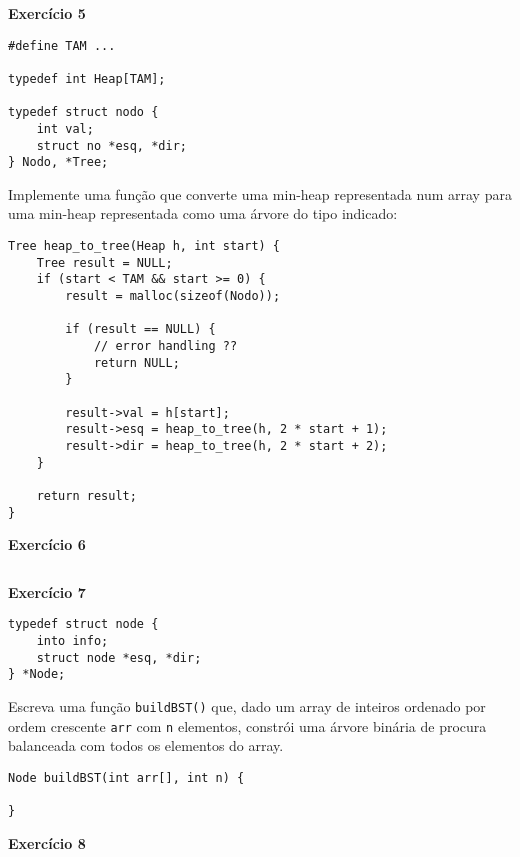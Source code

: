 \documentclass{article}
\begin{document}
\vspace{0.7cm}
\textbf{Exercício 5}
\begin{lstlisting}[style=mystyle]
#define TAM ...

typedef int Heap[TAM];

typedef struct nodo {
    int val;
    struct no *esq, *dir;
} Nodo, *Tree;
\end{lstlisting}

Implemente uma função que converte uma min-heap representada num array para uma min-heap representada como uma árvore do tipo indicado:
\begin{lstlisting}[style=mystyle]
Tree heap_to_tree(Heap h, int start) {
    Tree result = NULL;
    if (start < TAM && start >= 0) {
        result = malloc(sizeof(Nodo));

        if (result == NULL) {
            // error handling ??
            return NULL;
        }

        result->val = h[start];
        result->esq = heap_to_tree(h, 2 * start + 1);
        result->dir = heap_to_tree(h, 2 * start + 2);
    }

    return result;
}
\end{lstlisting}

\vspace{0.7cm}
\textbf{Exercício 6}
\begin{lstlisting}[style=mystyle]
\end{lstlisting}

\vspace{0.7cm}
\textbf{Exercício 7}
\begin{lstlisting}[style=mystyle]
typedef struct node {
    into info;
    struct node *esq, *dir;
} *Node;

\end{lstlisting}

Escreva uma função \texttt{buildBST()} que, dado um array de inteiros ordenado por ordem crescente \texttt{arr} com \texttt{n} elementos, constrói uma árvore binária de procura balanceada com todos os elementos do array.
\begin{lstlisting}[style=mystyle]
Node buildBST(int arr[], int n) {

}
\end{lstlisting}

\vspace{0.7cm}
\textbf{Exercício 8}
\begin{lstlisting}[style=mystyle]
\end{lstlisting}
\end{document}
